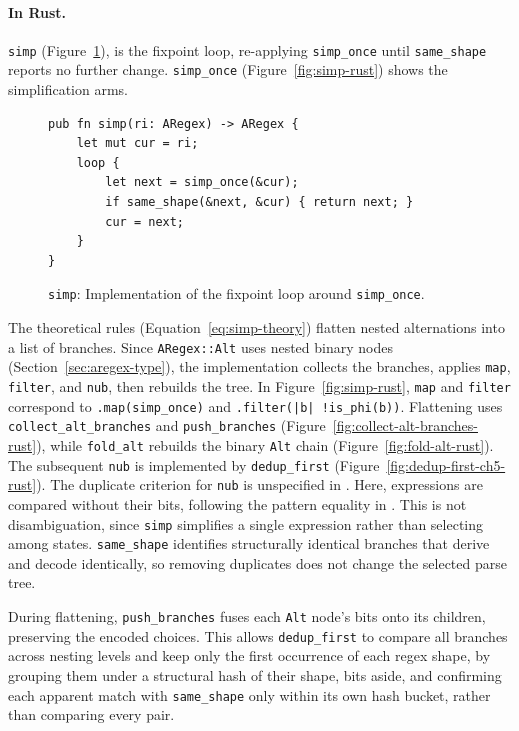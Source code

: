 \paragraph{In Rust.}
\label{sec:simp-impl}
\texttt{simp} (Figure~\ref{fig:simp-loop-rust}), 
is the fixpoint loop, re-applying \texttt{simp\_once} 
until \texttt{same\_shape} reports no further change.
\texttt{simp\_once} (Figure~\ref{fig:simp-rust}) shows the simplification arms.
\begin{figure}[H]
\small
\begin{verbatim}
pub fn simp(ri: ARegex) -> ARegex {
    let mut cur = ri;
    loop {
        let next = simp_once(&cur);
        if same_shape(&next, &cur) { return next; }
        cur = next;
    }
}
\end{verbatim}
\caption{\texttt{simp}: Implementation of the fixpoint loop around \texttt{simp\_once}.}
\label{fig:simp-loop-rust}
\end{figure}

%

The theoretical rules (Equation~\eqref{eq:simp-theory})
flatten nested alternations into a list of branches.
Since \texttt{ARegex::Alt} uses nested binary nodes
(Section~\ref{sec:aregex-type}), the implementation
collects the branches, applies \texttt{map}, \texttt{filter},
and \texttt{nub}, then rebuilds the tree.
In Figure~\ref{fig:simp-rust}, \texttt{map} and \texttt{filter}
correspond to \texttt{.map(simp\_once)} and
\texttt{.filter(|b| !is\_phi(b))}.
Flattening uses \texttt{collect\_alt\_branches} and
\texttt{push\_branches}
(Figure~\ref{fig:collect-alt-branches-rust}),
while \texttt{fold\_alt} rebuilds the binary \texttt{Alt} chain
(Figure~\ref{fig:fold-alt-rust}).
The subsequent \texttt{nub} is implemented by
\texttt{dedup\_first}
(Figure~\ref{fig:dedup-first-ch5-rust}).
The duplicate criterion for \texttt{nub} is unspecified
in \citet[Fig.~6]{sulzmannlu2014}.
Here, expressions are compared without their bits,
following the pattern equality in
\citet[Fig.~9]{sulzmannlu2012}.
This is not disambiguation, since \texttt{simp}
simplifies a single expression rather than selecting
among states. \texttt{same\_shape} identifies structurally
identical branches that derive and decode identically,
so removing duplicates does not change the selected parse tree.

\clearpage
During flattening, \texttt{push\_branches} fuses each
\texttt{Alt} node's bits onto its children, preserving
the encoded choices. 
This allows \texttt{dedup\_first}
to compare all branches across nesting levels and keep
only the first occurrence of each regex shape, by grouping them
under a structural hash of their shape, bits aside, and confirming
each apparent match with \texttt{same\_shape} only within its own
hash bucket, rather than comparing every pair.

